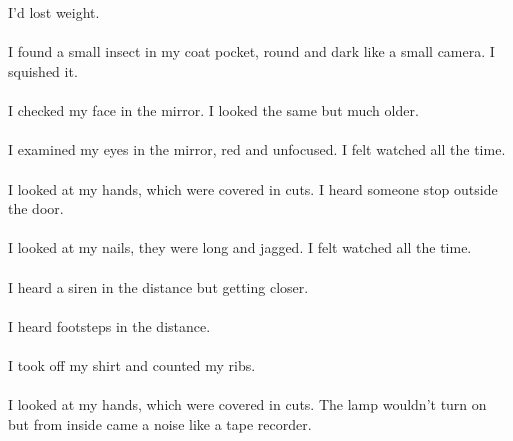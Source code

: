 \documentclass{article}
\begin{document}
    \section{}
    I'd lost weight. \\\\I found a small insect in my coat pocket, round and dark like a small camera. I squished it. \\\\I checked my face in the mirror. I looked the same but much older. \\\\I examined my eyes in the mirror, red and unfocused. I felt watched all the time. \\\\I looked at my hands, which were covered in cuts. I heard someone stop outside the door. \\\\I looked at my nails, they were long and jagged. I felt watched all the time. \\\\I heard a siren in the distance but getting closer. \\\\I heard footsteps in the distance. \\\\I took off my shirt and counted my ribs. \\\\I looked at my hands, which were covered in cuts. The lamp wouldn't turn on but from inside came a noise like a tape recorder. \\\\
    \newpage
    
\end{document}
